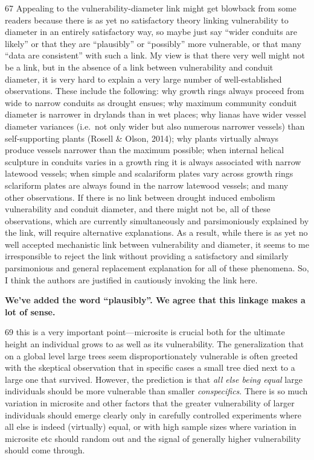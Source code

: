 \documentclass[
]{article}
\begin{document}
67 Appealing to the vulnerability-diameter link might get blowback from
some readers because there is as yet no satisfactory theory linking
vulnerability to diameter in an entirely satisfactory way, so maybe just
say ``wider conduits are likely'' or that they are ``plausibly'' or
``possibly'' more vulnerable, or that many ``data are consistent'' with
such a link. My view is that there very well might not be a link, but in
the absence of a link between vulnerability and conduit diameter, it is
very hard to explain a very large number of well-established
observations. These include the following: why growth rings always
proceed from wide to narrow conduits as drought ensues; why maximum
community conduit diameter is narrower in drylands than in wet places;
why lianas have wider vessel diameter variances (i.e.~not only wider but
also numerous narrower vessels) than self-supporting plants (Rosell \&
Olson, 2014); why plants virtually always produce vessels narrower than
the maximum possible; when internal helical sculpture in conduits varies
in a growth ring it is always associated with narrow latewood vessels;
when simple and scalariform plates vary across growth rings sclariform
plates are always found in the narrow latewood vessels; and many other
observations. If there is no link between drought induced embolism
vulnerability and conduit diameter, and there might not be, all of these
observations, which are currently simultaneously and parsimoniously
explained by the link, will require alternative explanations. As a
result, while there is as yet no well accepted mechanistic link between
vulnerability and diameter, it seems to me irresponsible to reject the
link without providing a satisfactory and similarly parsimonious and
general replacement explanation for all of these phenomena. So, I think
the authors are justified in cautiously invoking the link here.

\textbf{We've added the word ``plausibly''. We agree that this linkage
makes a lot of sense.}

69 this is a very important point---microsite is crucial both for the
ultimate height an individual grows to as well as its vulnerability. The
generalization that on a global level large trees seem
disproportionately vulnerable is often greeted with the skeptical
observation that in specific cases a small tree died next to a large one
that survived. However, the prediction is that \emph{all else being
equal} large individuals should be more vulnerable than smaller
\emph{conspecifics}. There is so much variation in microsite and other
factors that the greater vulnerability of larger individuals should
emerge clearly only in carefully controlled experiments where all else
is indeed (virtually) equal, or with high sample sizes where variation
in microsite etc should random out and the signal of generally higher
vulnerability should come through.
\end{document}

